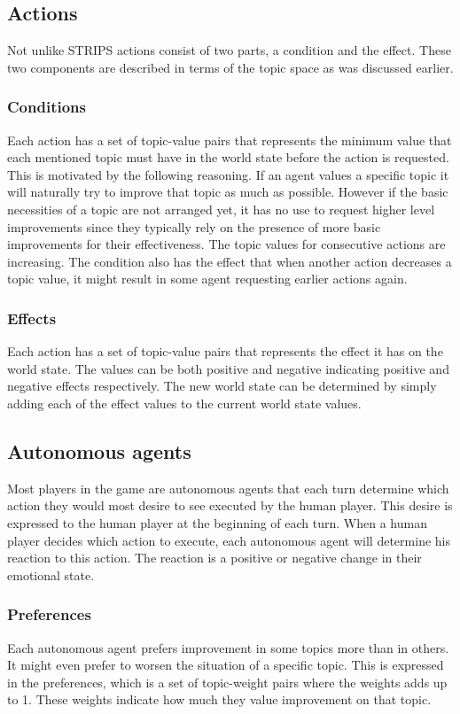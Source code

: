 \documentclass[11pt,a4paper]{article}
\begin{document}
  \subsection{Actions}
    Not unlike STRIPS actions consist of two parts, a condition and the effect. These two components are described in terms of the topic space as was discussed earlier.
    \subsubsection{Conditions}
      Each action has a set of topic-value pairs that represents the minimum value that each mentioned topic must have in the world state before the action is requested. This is motivated by the following reasoning. If an agent values a specific topic it will naturally try to improve that topic as much as possible. However if the basic necessities of a topic are not arranged yet, it has no use to request higher level improvements since they typically rely on the presence of more basic improvements for their effectiveness. The topic values for consecutive actions are increasing. The condition also has the effect that when another action decreases a topic value, it might result in some agent requesting earlier actions again.
    \subsubsection{Effects}
      Each action has a set of topic-value pairs that represents the effect it has on the world state. The values can be both positive and negative indicating positive and negative effects respectively. The new world state can be determined by simply adding each of the effect values to the current world state values.
  \subsection{Autonomous agents}
    Most players in the game are autonomous agents that each turn determine which action they would most desire to see executed by the human player. This desire is expressed to the human player at the beginning of each turn. When a human player decides which action to execute, each autonomous agent will determine his reaction to this action. The reaction is a positive or negative change in their emotional state.
    \subsubsection{Preferences}
      Each autonomous agent prefers improvement in some topics more than in others. It might even prefer to worsen the situation of a specific topic. This is expressed in the preferences, which is a set of topic-weight pairs where the weights adds up to 1. These weights indicate how much they value improvement on that topic.
\end{document}
